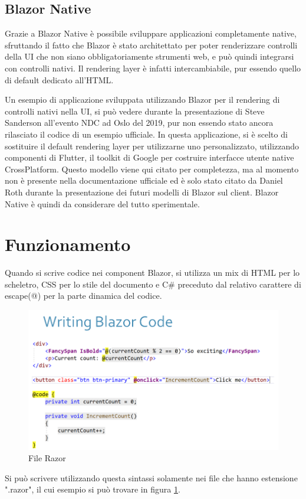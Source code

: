 \pagebreak

\subsection{Blazor Native}\label{sez:bnative}
Grazie a Blazor Native \`e possibile sviluppare applicazioni completamente native, sfruttando il fatto che Blazor \`e stato architettato per poter renderizzare controlli della UI che non siano obbligatoriamente strumenti web, e pu\`o quindi integrarsi con controlli nativi.
Il rendering layer \`e infatti intercambiabile, pur essendo quello di default dedicato all'HTML.

Un esempio di applicazione sviluppata utilizzando Blazor per il rendering di controlli nativi nella UI, si pu\`o vedere durante la presentazione di Steve Sanderson all'evento NDC ad Oslo del 2019, pur non essendo stato ancora rilasciato il codice di un esempio ufficiale\cite{sandersonNDCBlutter}.
In questa applicazione, si \`e scelto di sostituire il default rendering layer per utilizzarne uno personalizzato, utilizzando componenti di Flutter, il toolkit di Google per costruire interfacce utente native CrossPlatform.
Questo modello viene qui citato per completezza, ma al momento non \`e presente nella documentazione ufficiale ed \`e solo stato citato da Daniel Roth durante la presentazione dei futuri modelli di Blazor sul client\cite{blazorNative}.
Blazor Native \`e quindi da considerare del tutto sperimentale.

\section{Funzionamento}\label{sez:funzionamento}
Quando si scrive codice nei component Blazor, si utilizza un mix di HTML per lo scheletro, CSS per lo stile del documento e C\# preceduto dal relativo carattere di escape(@) per la parte dinamica del codice.
\begin{figure}[H]
	\centerline{\includegraphics[scale=0.55]{figure/RazorFile.png}}
	\caption{File Razor}
	\label{fig:razorFile}
\end{figure}
Si pu\`o scrivere utilizzando questa sintassi solamente nei file che hanno estensione ".razor", il cui esempio si pu\`o trovare in figura \ref{fig:razorFile}.


